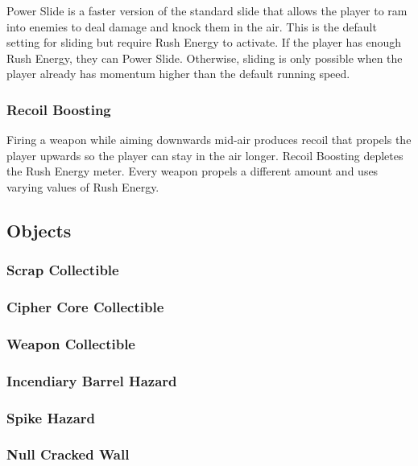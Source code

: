 \documentclass[12pt]{article}
\begin{document}
Power Slide is a faster version of the standard slide that allows the player to ram into enemies to deal damage and knock them in the air. This is the default setting for sliding but require Rush Energy to activate. If the player has enough Rush Energy, they can Power Slide. Otherwise, sliding is only possible when the player already has momentum higher than the default running speed. 

\subsubsection{Recoil Boosting}

Firing a weapon while aiming downwards mid-air produces recoil that propels the player upwards so the player can stay in the air longer. Recoil Boosting depletes the Rush Energy meter. Every weapon propels a different amount and uses varying values of Rush Energy. 

\subsection{Objects}

\subsubsection{Scrap Collectible}

\subsubsection{Cipher Core Collectible}

\subsubsection{Weapon Collectible}

\subsubsection{Incendiary Barrel Hazard}

\subsubsection{Spike Hazard}

\subsubsection{Null Cracked Wall}
\end{document}

